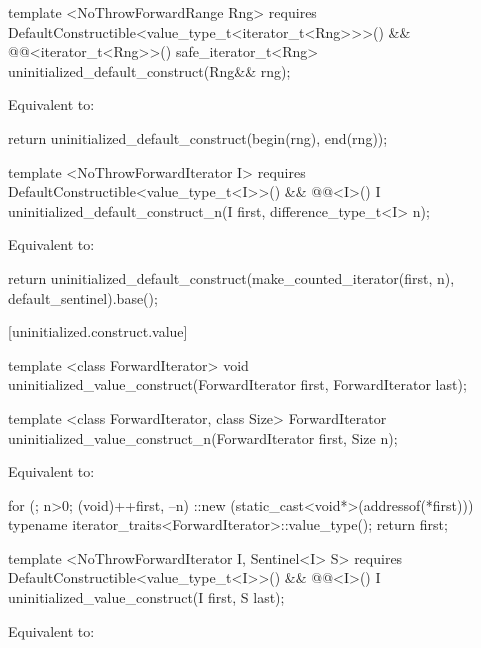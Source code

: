 {\color{addclr}
\begin{codeblock}
  template <NoThrowForwardRange Rng>
    requires DefaultConstructible<value_type_t<iterator_t<Rng>>>() &&
             @@<iterator_t<Rng>>()
  safe_iterator_t<Rng>
  uninitialized_default_construct(Rng&& rng);
\end{codeblock}

\pnum
\effects Equivalent to:
\begin{codeblock}
        return uninitialized_default_construct(begin(rng), end(rng));
\end{codeblock}

\begin{codeblock}
template <NoThrowForwardIterator I>
  requires DefaultConstructible<value_type_t<I>>() &&
           @@<I>()
    I uninitialized_default_construct_n(I first, difference_type_t<I> n);
\end{codeblock}

\pnum
\effects Equivalent to:
\begin{codeblock}
        return uninitialized_default_construct(make_counted_iterator(first, n),
                                               default_sentinel{}).base();
\end{codeblock}
} %

[uninitialized.construct.value]{}
{\color{remclr}
\begin{codeblock}
template <class ForwardIterator>
  void uninitialized_value_construct(ForwardIterator first, ForwardIterator last);
\end{codeblock}

\begin{codeblock}
template <class ForwardIterator, class Size>
  ForwardIterator uninitialized_value_construct_n(ForwardIterator first, Size n);
\end{codeblock}
\setcounter{Paras}{1}
\pnum
\effects Equivalent to:
\begin{codeblock}
        for (; n>0; (void)++first, --n)
          ::new (static_cast<void*>(addressof(*first)))
            typename iterator_traits<ForwardIterator>::value_type();
        return first;
\end{codeblock}
} %

{\color{addclr}
\begin{codeblock}
template <NoThrowForwardIterator I, Sentinel<I> S>
  requires DefaultConstructible<value_type_t<I>>() &&
           @@<I>()
    I uninitialized_value_construct(I first, S last);
\end{codeblock}

\setcounter{Paras}{0}
\pnum
\effects Equivalent to:
} %


